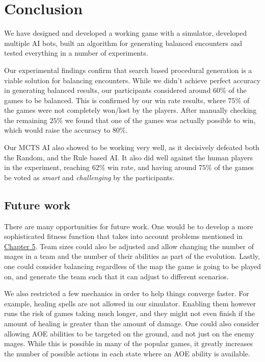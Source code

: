 \chapter{Conclusion}
\label{chapter06}

We have designed and developed a working game with a simulator, developed multiple
AI bots, built an algorithm for generating balanced encounters and tested everything
in a number of experiments.

Our experimental findings confirm that search based procedural generation
is a viable solution for balancing encounters. While we didn't achieve perfect
accuracy in generating balanced results, our participants considered around $60\%$
of the games to be balanced. This is confirmed by our win rate results, where $75\%$
of the games were not completely won/lost by the players. After manually checking the remaining
$25\%$ we found that one of the games was actually possible to win, which would raise the accuracy
to $80\%$.

Our MCTS AI also showed to be working very well, as it decisively defeated both the Random, and the Rule based AI.
It also did well against the human players in the experiment, reaching $62\%$ win rate, and having around $75\%$ of the
games be voted as \emph{smart} and \emph{challenging} by the participants.

\section{Future work}

There are many opportunities for future work. One would be to develop a more sophisticated fitness function that
takes into account problems mentioned in \hyperref[chapter05]{Chapter 5}. Team sizes could also be adjusted and allow
changing the number of mages in a team and the number of their abilities as part of the evolution. Lastly, one could
consider balancing regardless of the map the game is going to be played on, and generate the team such that it can adjust
to different scenarios.

We also restricted a few mechanics in order to help things converge faster. For example, healing spells are not allowed
in our simulator. Enabling them however runs the risk of games taking much longer, and they might not even finish if
the amount of healing is greater than the amount of damage. One could also consider allowing AOE abilities to be targeted
on the ground, and not just on the enemy mages. While this is possible in many of the popular games, it greatly increases
the number of possible actions in each state where an AOE ability is available.